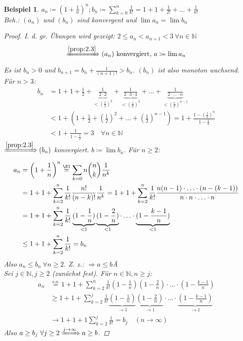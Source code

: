 \documentclass[titlepage,ngerman,a4paper,headsepline,DIV15,halfparskip*,14pt]{scrartcl}
\newcommand{\N}{\mathbb{N}}
\theoremstyle{dotless}
\newtheorem{beispiel}[satz]{Beispiel}
\begin{document}
\begin{beispiel} \label{bsp:2.9}
	$a_{n} \coloneqq \left( 1 + \frac{1}{n} \right)^{n}; b_{n} \coloneqq \sum_{k = 0}^{n} \frac{1}{k!} = 1 + 1 + \frac{1}{2!} + \dotsc + \frac{1}{n!}$ \\
	Beh.: $(a_{n})$ und $(b_{n})$ sind konvergent und $\lim a_{n} = \lim b_{n}$
	
	\begin{proof}
		I. d. gr. Übungen wird gezeigt: $2 \leq a_{n} < a_{n+1} < 3 ~\forall n \in \N$
		$$
			\xRightarrow[]{\ref{prop:2.3}} (a_{n}) \text{ konvergiert, } a \coloneqq \lim a_{n}
		$$
		Es ist $b_{n} > 0$ und $b_{n+1} = b_{n} + \frac{1}{(n+1)!} > b_{n}$. $(b_{n})$ ist also monoton wachsend. Für $n > 3$:
		\begin{align*} 
			b_{n} & = 1 + 1 + \frac{1}{2} + \underbrace{\frac{1}{2 \cdot 2}}_{< \left(\frac{1}{2}\right)^{2}} + \underbrace{\frac{1}{2 \cdot 3 \cdot 4}}_{< \left(\frac{1}{2}\right)^{3}} + \dotsc + \underbrace{\frac{1}{2 \cdot \dotsc \cdot n}}_{< \left(\frac{1}{2}\right)^{n-1}} \\
				  & < 1 + \left( 1 + \frac{1}{2} + (\frac{1}{2})^{2} + \dotsc + (\frac{1}{2})^{n-1} \right) = 1 + \frac{1 - \left( \frac{1}{2} \right)^{n}}{1 - \frac{1}{2}} \\
				  & < 1 + \frac{1}{1 - \frac{1}{2}} = 3 \quad \forall n \in \N
		\end{align*} 
		$\xRightarrow[]{\ref{prop:2.3}} (b_{n})$ konvergiert. $b \coloneqq \lim b_{n}$. Für $n \geq 2$:
		\begin{align*}
			a_{n} & = \left( 1 + \frac{1}{n} \right)^{n} \overset{\S 1}{=} \sum_{k=0}{n} \binom{n}{k} \frac{1}{n^{k}} \\
				  & = 1 + 1 + \sum_{k = 2}^{n} \frac{1}{k!} \frac{n!}{(n-k)!} \frac{1}{n^{k}} = 1 + 1 + \sum_{k=2}^{n} \frac{1}{k!} \frac{n(n-1) \cdot \dotsc \cdot (n-(k-1))}{n \cdot n \cdot \dotsc \cdot n} \\
				  & = 1 + 1 + \sum_{k=2}^{n} \frac{1}{k!} \underbrace{(1 - \frac{1}{n})}_{< 1} \underbrace{(1 - \frac{2}{n})}_{< 1} \cdot \dotsc \cdot \underbrace{(1 - \frac{k-1}{n})}_{< 1} \\
				  & \leq 1 + 1 + \sum_{k=2}^{n} \frac{1}{k!} = b_{n}
		\end{align*}
		Also $a_{n} \leq b_{n} ~\forall n \geq 2$. Z. z.: $\Rightarrow a \leq b$Â \\
		Sei $j \in \N, j \geq 2$ (zunächst fest). Für $n \in \N, n \geq j$:
		\begin{align*}
			a_{n} & \overset{s.o.}{=} 1 + 1 + \sum_{k=2}^{n} \frac{1}{k!} (1-\frac{1}{n})(1-\frac{2}{n}) \cdot \dotsc \cdot (1-\frac{k-1}{n}) \\
				  & \geq 1 + 1 + \sum_{k = 2}^{j} \frac{1}{k!} \underbrace{(1-\frac{1}{n})}_{\rightarrow 1} \underbrace{(1-\frac{2}{n})}_{\rightarrow 1} \cdot \dotsc \cdot \underbrace{(1-\frac{k-1}{n})}_{\rightarrow 1} \\
				  & \rightarrow 1 + 1 + 1 \sum_{k=2}^{j} \frac{1}{k!} = b_{j} \quad (n \rightarrow \infty)
		\end{align*}
		Also $a \geq b_{j} ~\forall j \geq 2 \xRightarrow[]{j \rightarrow \infty} a \geq b$.
	\end{proof}
\end{beispiel}
\end{document}
